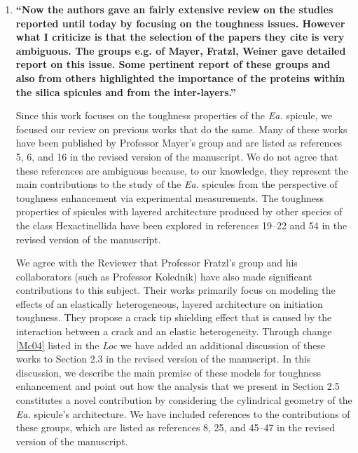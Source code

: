 \documentclass[11pt,letterpaper]{report}
\makeatletter
\newcommand{\EA}{\textit{Ea.\@}\xspace}
\makeatother
\begin{document}
\begin{enumerate}[label=\textit{3.\arabic*},wide, labelwidth=!, labelindent=0pt]
\item \label{r3c1} {\bf ``Now the authors gave an fairly extensive review on the studies reported until today by focusing on the toughness issues. However what I criticize is that the selection of the papers they cite is very ambiguous. The groups e.g. of Mayer, Fratzl, Weiner gave detailed report on this issue. Some pertinent report of these groups and also from others highlighted the importance of the proteins within the silica spicules and from the inter-layers.''}

Since this work focuses on the toughness properties of the \EA spicule, we focused our review on previous works that do the same. Many of these works have been published by Professor Mayer's group and are listed as references 5, 6, and 16 in the revised version of the manuscript. We do not agree that these references are ambiguous because, to our knowledge, they represent the main contributions to the study of the \EA spicules from the perspective of toughness enhancement via experimental measurements. The toughness properties of spicules with layered architecture produced by other species of the class Hexactinellida have been explored in references 19--22 and 54 in the revised version of the manuscript.

We agree with the Reviewer that Professor Fratzl's group and his collaborators (such as Professor Kolednik) have also made significant contributions to this subject. Their works primarily focus on modeling the effects of an elastically heterogeneous, layered architecture on initiation toughness. They propose a crack tip shielding effect that is caused by the interaction between a crack and an elastic heterogeneity. Through change \ref{Mc04} listed in the \emph{Loc} we have added an additional discussion of these works to Section 2.3 in the revised version of the manuscript. In this discussion, we describe the main premise of these models for toughness enhancement and point out how the analysis that we present in Section 2.5 constitutes a novel contribution by considering the cylindrical geometry of the \EA spicule's architecture. We have included references to the contributions of these groups, which are listed as references 8, 25, and 45--47 in the revised version of the manuscript.


\end{enumerate}
\end{document}
